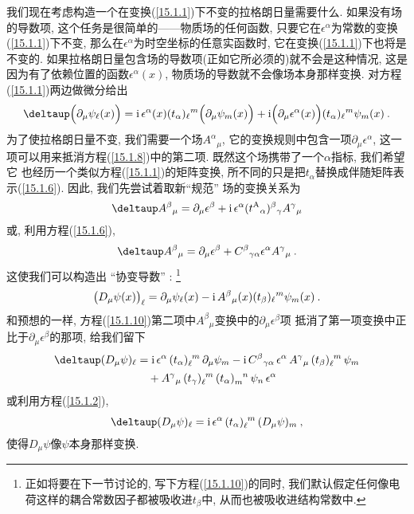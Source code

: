 我们现在考虑构造一个在变换(\ref{15.1.1})下不变的拉格朗日量需要什么. 如果没有场的导数项, 
这个任务是很简单的——物质场的任何函数, 只要它在$\epsilon ^{\alpha }$为常数的变换(\ref{15.1.1})下不变, 
那么在$\epsilon ^{\alpha }$为时空坐标的任意实函数时, 它在变换(\ref{15.1.1})下也将是不变的. 
如果拉格朗日量包含场的导数项(正如它所必须的)就不会是这种情况, 这是因为有了依赖位置的函数$\epsilon ^{\alpha }(x)$,
物质场的导数就不会像场本身那样变换. 对方程(\ref{15.1.1})两边做微分给出
\begin{equation}
\deltaup \Big( \partial _{\mu }\psi _{\ell }(x)\Big) =\mi\,\epsilon ^{\alpha
}(x)(t_{\alpha })_{\ell }{}^{m}\Big( \partial _{\mu }\psi
_{m}(x)\Big) +\mi\Big( \partial _{\mu }\epsilon ^{\alpha }(x)\Big)
(t_{\alpha })_{\ell}{}^{m}\psi _{m}(x)\:.  \label{15.1.8}
\end{equation}%
为了使拉格朗日量不变, 我们需要一个场$A^{\alpha }{}_{\mu }$, 它的变换规则中包含一项$\partial _{\mu }\epsilon
^{\alpha }$, 这一项可以用来抵消方程(\ref{15.1.8})中的第二项. 既然这个场携带了一个$\alpha $指标, 我们希望它%
也经历一个类似方程(\ref{15.1.1})的矩阵变换, 所不同的只是把$t_{\alpha }$替换成伴随矩阵表示(\ref{15.1.6}). 因此, 
我们先尝试着取新``规范'' 场的变换关系为
\[
\deltaup A^{\beta}{}_{\mu }=\partial _{\mu }\epsilon ^{\beta}+
\mi\,\epsilon ^{\alpha }({t^{\text{A}}}_{\alpha })^{\beta}{}_{\gamma}A^{\gamma}{}_{\mu }
\]%
或, 利用方程(\ref{15.1.6}),%
\begin{equation}
\deltaup A^{\beta }{}_{\mu }=\partial _{\mu }\epsilon ^{\beta
}+C^{\beta}{}_{\gamma \alpha }\epsilon ^{\alpha }A^{\gamma}{}_{\mu }\:. \label{15.1.9}
\end{equation}%
这使我们可以构造出 ``协变导数'' :%
\footnote{正如将要在下一节讨论的, 写下方程(\ref{15.1.10})的同时, 我们默认假定任何像电荷这样的耦合常数因子都被吸收进$t_{\beta }$中,
从而也被吸收进结构常数中.}%
\begin{equation}
\big(D_{\mu }\psi (x)\big)_{\ell }=\partial _{\mu }\psi _{\ell }(x)
-\mathrm{i}\,A^{\beta}{}_{\mu }(x)(t_{\beta })_{\ell}{}^{m}\psi_{m}(x) \:.  \label{15.1.10}
\end{equation}%
和预想的一样, 方程(\ref{15.1.10})第二项中${A^{\beta }}_{\mu }$变换中的$\partial _{\mu }\epsilon ^{\beta }$项%
抵消了第一项变换中正比于$\partial _{\mu }\epsilon ^{\beta }$的那项, 给我们留下\begin{align*}
\deltaup (D_{\mu }\psi )_{\ell } &=\mi\,\epsilon ^{\alpha }\,(t_{\alpha })_{\ell }^{%
\phantom{\ell}m}\,\partial _{\mu }\psi _{m}-\mi\,{C^{\beta }}_{\gamma \alpha
}\,\epsilon ^{\alpha }\,{A^{\gamma }}_{\mu }\,(t_{\beta
})_{\ell }^{\phantom{\ell}m}\,\psi _{m} \\
&\quad+{A^{\gamma }}_{\mu }\,(t_{\gamma })_{\ell }^{\phantom{\ell}%
m}\,(t_{\alpha })_{m}^{\phantom{m}n}\,\psi _{n}\, \epsilon^{\alpha}
\end{align*}%
或利用方程(\ref{15.1.2}),%
\begin{equation}
\deltaup (D_{\mu }\psi )_{\ell }=\mi\,\epsilon ^{\alpha }\,(t_{\alpha })_{\ell }^{%
\phantom{\ell}m}\,(D_{\mu }\psi )_{m}\:,  \label{15.1.11}
\end{equation}%
使得$D_{\mu }\psi $像$\psi $本身那样变换.

